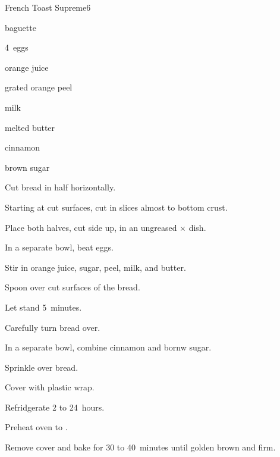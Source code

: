 \begin{recipe}{French Toast Supreme}{}{6}

\begin{ingredients}
\item baguette
\item 4~eggs
\item \C{\third} orange juice
\item \tp{\half} grated orange peel
\item \C{1\quarter} milk
\item {} melted butter
\item \tp{\eighth} cinnamon
\item {} brown sugar
\end{ingredients}

\begin{directions}
\item Cut bread in half horizontally.
\item Starting at cut surfaces, cut in  slices almost to bottom crust.
\item Place both halves, cut side up, in an ungreased $\times$ dish.
\item In a separate bowl, beat eggs.
\item Stir in orange juice, sugar, peel, milk, and butter.
\item Spoon over cut surfaces of the bread.
\item Let stand 5~minutes.
\item Carefully turn bread over.
\item In a separate bowl, combine cinnamon and bornw sugar.
\item Sprinkle over bread.
\item Cover with plastic wrap.
\item Refridgerate 2 to 24~hours.
\item Preheat oven to .
\item Remove cover and bake for 30 to 40~minutes until golden brown and firm.
\end{directions}

\end{recipe}
